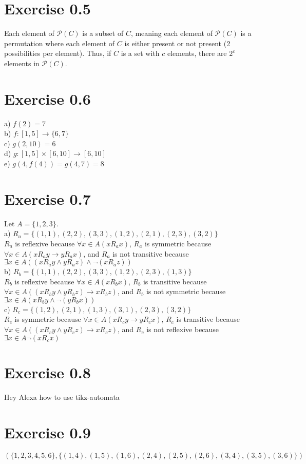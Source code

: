 \documentclass{article}
\begin{document}
\section{Exercise 0.5}
Each element of $\mathcal{P}(C)$ is a subset of $C$, meaning each element of $\mathcal{P}(C)$ is a permutation where each element of $C$ is either present or not present (2 possibilities per element). Thus, if $C$ is a set with $c$ elements, there are $2^c$ elements in $\mathcal{P}(C)$.

\section{Exercise 0.6}
a) $f(2) = 7$
\\b) $f:[1, 5] \rightarrow \{6, 7\}$
\\c) $g(2, 10) = 6$
\\d) $g:[1, 5] \times [6, 10] \rightarrow [6, 10]$
\\e) $g(4, f(4)) = g(4, 7) = 8$

\section{Exercise 0.7}
Let $A = \{1, 2, 3\}$.
\\a) $R_a = \{(1, 1), (2, 2), (3, 3), (1, 2), (2, 1), (2, 3), (3, 2)\}$
\\$R_a$ is reflexive because $\forall x\in A (x R_a x)$,
$R_a$ is symmetric because $\forall x\in A (x R_a y \rightarrow y R_a x)$,
and $R_a$ is not transitive because $\exists x\in A ((x R_a y \wedge y R_a z) \wedge \neg(x R_a z))$
\\b) $R_b = \{(1, 1), (2, 2), (3, 3), (1, 2), (2, 3), (1, 3)\}$
\\$R_b$ is reflexive because $\forall x\in A (x R_b x)$,
$R_b$ is transitive because $\forall x\in A ((x R_b y \wedge y R_b z) \rightarrow x R_b z)$,
and $R_b$ is not symmetric because $\exists x\in A (x R_b y \wedge \neg(y R_b x))$
\\c) $R_c = \{(1, 2), (2, 1), (1, 3), (3, 1), (2, 3), (3, 2)\}$
\\$R_c$ is symmetric because $\forall x\in A (x R_c y \rightarrow y R_c x)$,
$R_c$ is transitive because $\forall x\in A ((x R_c y \wedge y R_c z) \rightarrow x R_c z)$,
and $R_c$ is not reflexive because $\exists x\in A \neg(x R_c x)$

\section{Exercise 0.8}
Hey Alexa how to use tikz-automata

\section{Exercise 0.9}
$(\{1, 2, 3, 4, 5, 6\}, \{(1, 4), (1, 5), (1, 6), (2, 4), (2, 5), (2, 6), (3, 4), (3, 5), (3, 6)\})$

\end{document}
